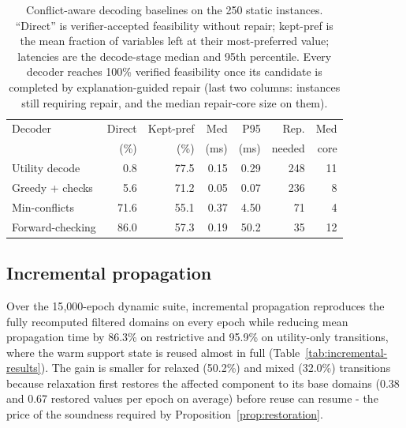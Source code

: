 \documentclass[pdflatex,sn-mathphys-num,iicol,oneside]{sn-jnl}
\begin{document}
\begin{table}[t]
\centering
\caption{Conflict-aware decoding baselines on the 250 static instances.
``Direct'' is verifier-accepted feasibility without repair; kept-pref
is the mean fraction of variables left at their most-preferred value;
latencies are the decode-stage median and 95th percentile. Every
decoder reaches 100\% verified feasibility once its candidate is
completed by explanation-guided repair (last two columns: instances
still requiring repair, and the median repair-core size on them).}
\label{tab:decoders}
\setlength{\tabcolsep}{3.5pt}\small
\begin{tabular}{lrrrrrr}
\toprule
Decoder & Direct & Kept-pref & Med & P95 & Rep. & Med\\
 & (\%) & (\%) & (ms) & (ms) & needed & core\\
\midrule
Utility decode        & 0.8  & 77.5 & 0.15 & 0.29  & 248 & 11\\
Greedy + checks       & 5.6  & 71.2 & 0.05 & 0.07  & 236 & 8\\
Min-conflicts         & 71.6 & 55.1 & 0.37 & 4.50  & 71  & 4\\
Forward-checking      & 86.0 & 57.3 & 0.19 & 50.2  & 35  & 12\\
\bottomrule
\end{tabular}
\normalsize
\end{table}

\subsection{Incremental propagation}

Over the 15{,}000-epoch dynamic suite, incremental propagation
reproduces the fully recomputed filtered domains on every epoch while
reducing mean propagation time by 86.3\% on restrictive and 95.9\% on
utility-only transitions, where the warm support state is reused
almost in full (Table~\ref{tab:incremental-results}). The gain is
smaller for relaxed (50.2\%) and mixed (32.0\%) transitions because
relaxation first restores the affected component to its base domains
(0.38 and 0.67 restored values per epoch on average) before reuse can
resume - the price of the soundness required by
Proposition~\ref{prop:restoration}.
\end{document}

